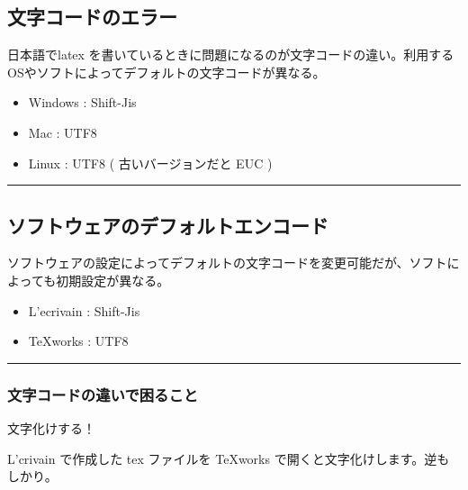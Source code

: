 \hypertarget{ux6587ux5b57ux30b3ux30fcux30c9ux306eux30a8ux30e9ux30fc}{\subsection{文字コードのエラー}\label{ux6587ux5b57ux30b3ux30fcux30c9ux306eux30a8ux30e9ux30fc}}

日本語でlatex
を書いているときに問題になるのが文字コードの違い。利用するOSやソフトによってデフォルトの文字コードが異なる。

\begin{itemize}
\tightlist
\item
  Windows : Shift-Jis
\item
  Mac : UTF8
\item
  Linux : UTF8 ( 古いバージョンだと EUC )
\end{itemize}

\begin{center}\rule{0.5\linewidth}{\linethickness}\end{center}

\hypertarget{ux30bdux30d5ux30c8ux30a6ux30a7ux30a2ux306eux30c7ux30d5ux30a9ux30ebux30c8ux30a8ux30f3ux30b3ux30fcux30c9}{\subsection{ソフトウェアのデフォルトエンコード}\label{ux30bdux30d5ux30c8ux30a6ux30a7ux30a2ux306eux30c7ux30d5ux30a9ux30ebux30c8ux30a8ux30f3ux30b3ux30fcux30c9}}

ソフトウェアの設定によってデフォルトの文字コードを変更可能だが、ソフトによっても初期設定が異なる。

\begin{itemize}
\tightlist
\item
  L'ecrivain : Shift-Jis
\item
  TeXworks : UTF8
\end{itemize}

\begin{center}\rule{0.5\linewidth}{\linethickness}\end{center}

\subsubsection{文字コードの違いで困ること}\label{ux6587ux5b57ux30b3ux30fcux30c9ux306eux9055ux3044ux3067ux56f0ux308bux3053ux3068}

文字化けする！

L'crivain で作成した tex ファイルを TeXworks
で開くと文字化けします。逆もしかり。

